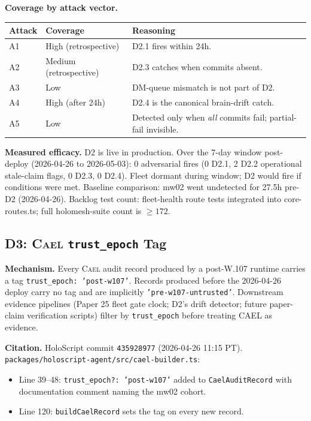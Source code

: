 \documentclass[letterpaper,twocolumn,10pt]{article}
\newcommand{\cael}{\textsc{Cael}}
\newcommand{\holoscript}{HoloScript}
\newcommand{\trustepoch}{\texttt{trust\_epoch}}
\begin{document}
\textbf{Coverage by attack vector.}
\begin{center}\begin{tabular}{lll}
\toprule
Attack & Coverage & Reasoning \\
\midrule
A1 & High (retrospective) & D2.1 fires within 24h. \\
A2 & Medium (retrospective) & D2.3 catches when commits absent. \\
A3 & Low & DM-queue mismatch is not part of D2. \\
A4 & High (after 24h) & D2.4 is the canonical brain-drift catch. \\
A5 & Low & Detected only when \emph{all} commits fail; partial-fail invisible. \\
\bottomrule
\end{tabular}\end{center}

\textbf{Measured efficacy.} D2 is live in production. Over the 7-day
window post-deploy (2026-04-26 to 2026-05-03): 0 adversarial fires
(0 D2.1, 2 D2.2 operational stale-claim flags, 0 D2.3, 0 D2.4). Fleet
dormant during window; D2 would fire if conditions were met. Baseline
comparison: mw02 went undetected for 27.5h pre-D2 (2026-04-26). Backlog
test count: fleet-health route tests integrated into core-routes.ts; full
holomesh-suite count is $\geq 172$.

\subsection{D3: \cael{} \trustepoch{} Tag}
\label{sec:d3}

\textbf{Mechanism.} Every \cael{} audit record produced by a
post-W.107 runtime carries a tag
\texttt{trust\_epoch: 'post-w107'}. Records produced before the
2026-04-26 deploy carry no tag and are implicitly
\texttt{'pre-w107-untrusted'}. Downstream evidence pipelines (Paper
25 fleet gate clock; D2's drift detector; future paper-claim
verification scripts) filter by \trustepoch{} before treating CAEL as
evidence.

\textbf{Citation.} \holoscript{} commit \texttt{435928977}
(2026-04-26 11:15 PT).
\texttt{packages/holoscript-agent/src/cael-builder.ts}:
\begin{itemize}[topsep=2pt,itemsep=1pt]
\item Line 39--48: \texttt{trust\_epoch?: 'post-w107'} added to
\texttt{CaelAuditRecord} with documentation comment naming the
mw02 cohort.
\item Line 120: \texttt{buildCaelRecord} sets the tag on every new
record.
\end{itemize}
\end{document}
